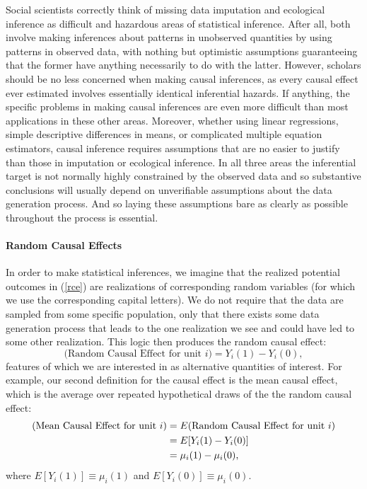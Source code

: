 \documentclass[11pt,titlepage]{article}
\begin{document}
Social scientists correctly think of missing data imputation and
ecological inference as difficult and hazardous areas of statistical
inference.  After all, both involve making inferences about patterns
in unobserved quantities by using patterns in observed data, with
nothing but optimistic assumptions guaranteeing that the former have
anything necessarily to do with the latter.  However, scholars should
be no less concerned when making causal inferences, as every causal
effect ever estimated involves essentially identical inferential
hazards.  If anything, the specific problems in making causal
inferences are even more difficult than most applications in these
other areas.  Moreover, whether using linear regressions, simple
descriptive differences in means, or complicated multiple equation
estimators, causal inference requires assumptions that are no easier
to justify than those in imputation or ecological inference.  In all
three areas the inferential target is not normally highly constrained
by the observed data and so substantive conclusions will usually
depend on unverifiable assumptions about the data generation process.
And so laying these assumptions bare as clearly as possible throughout
the process is essential.

\paragraph{Random Causal Effects} In order to make statistical
inferences, we imagine that the realized potential outcomes in
(\ref{rce}) are realizations of corresponding random variables (for
which we use the corresponding capital letters).  We do not require
that the data are sampled from some specific population, only that
there exists some data generation process that leads to the one
realization we see and could have led to some other realization.  This
logic then produces the random causal effect:
\begin{equation}
  \label{rance}
  \text{(Random Causal Effect for unit $i$)}  = Y_i(1) - Y_i(0),
\end{equation}
features of which we are interested in as alternative quantities of
interest.  For example, our second definition for the causal effect is
the mean causal effect, which is the average over repeated
hypothetical draws of the the random causal effect:
\begin{align}
  \label{meance}
  \text{(Mean Causal Effect for unit $i$)}
  &= E(\text{Random Causal Effect for unit $i$})\\
  &= E[Y_i(1) - Y_i(0)]\\ \notag &= \mu_i(1) - \mu_i(0),
\end{align}
where $E[Y_i(1)]\equiv\mu_i(1)$ and $E[Y_i(0)]\equiv\mu_i(0)$.
\end{document}
